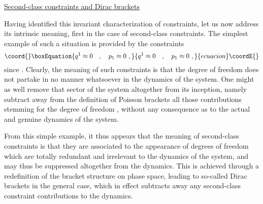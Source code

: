 \documentclass[a4paper,11pt]{article}
\begin{document}
\vspace{10pt}

\noindent\underline{Second-class constraints and Dirac brackets}

\vspace{5pt}

Having identified this invariant characterization of constraints,
let us now address its intrinsic meaning, first in the case
of second-class constraints. The simplest example of such a situation
is provided by the constraints
\begin{equation}\coord{}\boxEquation{
q^1\approx 0\ \ \ ,\ \ \ p_1\approx 0\ ,
}{
q^1\approx 0\ \ \ ,\ \ \ p_1\approx 0\ ,
}{ecuacion}\coordE{}\end{equation}
since \coordHE{}. Clearly, the meaning of such constraints is that
the degree of freedom \coordHE{} does not partake in no manner whatsoever
in the dynamics of the system. One might as well remove that sector of
the system altogether from its inception, namely subtract away from the
definition of Poisson bra\-ckets all those contributions stemming for the
degree of freedom \coordHE{}, without any consequence as to the actual and genuine
dynamics of the system.

From this simple example, it thus appears that the meaning of second-class
constraints is that they are associated to the appearance of degrees of
freedom which are totally redundant and irrelevant to the dynamics of the
system, and may thus be suppressed altogether from the dynamics. This is
achieved through a redefinition of the bracket structure on phase space,
leading to so-called Dirac brackets in the general case, which in effect
subtracts away any second-class constraint contributions to the dynamics.
\end{document}
